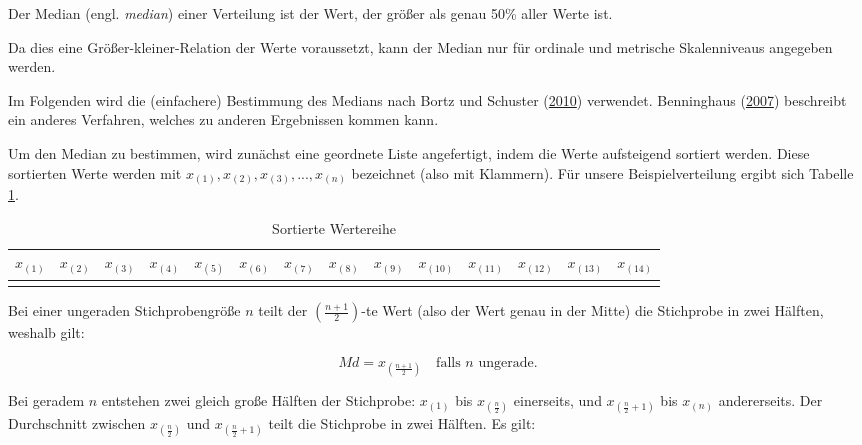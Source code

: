 \documentclass[
  11pt,
  ngerman,
  a4paper,
]{report}
\begin{document}
Der Median (engl. \emph{median}) einer Verteilung ist der Wert, der größer als genau 50\% aller Werte ist.

Da dies eine Größer-kleiner-Relation der Werte voraussetzt, kann der Median nur für ordinale und metrische Skalenniveaus angegeben werden.

Im Folgenden wird die (einfachere) Bestimmung des Medians nach Bortz und Schuster (\protect\hyperlink{ref-bortz}{2010}) verwendet. Benninghaus (\protect\hyperlink{ref-benninghaus}{2007}) beschreibt ein anderes Verfahren, welches zu anderen Ergebnissen kommen kann.

Um den Median zu bestimmen, wird zunächst eine geordnete Liste angefertigt, indem die Werte aufsteigend sortiert werden. Diese sortierten Werte werden mit \(x_{(1)}, x_{(2)}, x_{(3)}, ..., x_{(n)}\) bezeichnet (also mit Klammern). Für unsere Beispielverteilung ergibt sich Tabelle \ref{tab:sort}.

\begin{table}

\caption{\label{tab:sort}Sortierte Wertereihe}
\centering
\begin{tabular}[t]{rrrrrrrrrrrrrr}
\toprule
\textbf{$x_{(1)}$} & \textbf{$x_{(2)}$} & \textbf{$x_{(3)}$} & \textbf{$x_{(4)}$} & \textbf{$x_{(5)}$} & \textbf{$x_{(6)}$} & \textbf{$x_{(7)}$} & \textbf{$x_{(8)}$} & \textbf{$x_{(9)}$} & \textbf{$x_{(10)}$} & \textbf{$x_{(11)}$} & \textbf{$x_{(12)}$} & \textbf{$x_{(13)}$} & \textbf{$x_{(14)}$}\\
\midrule
\cellcolor{gray!6}{0} & \cellcolor{gray!6}{1} & \cellcolor{gray!6}{1} & \cellcolor{gray!6}{1} & \cellcolor{gray!6}{1} & \cellcolor{gray!6}{3} & \cellcolor{gray!6}{3} & \cellcolor{gray!6}{4} & \cellcolor{gray!6}{4} & \cellcolor{gray!6}{5} & \cellcolor{gray!6}{5} & \cellcolor{gray!6}{5} & \cellcolor{gray!6}{8} & \cellcolor{gray!6}{25}\\
\bottomrule
\end{tabular}
\end{table}

Bei einer ungeraden Stichprobengröße \(n\) teilt der \((\frac{n+1}{2})\)-te Wert (also der Wert genau in der Mitte) die Stichprobe in zwei Hälften, weshalb gilt:

\[
  \mathit{Md} = x_{(\frac{n+1}{2})} \quad \text{falls }n\text{ ungerade.}
  \label{eq:med1}
\]

Bei geradem \(n\) entstehen zwei gleich große Hälften der Stichprobe: \(x_{(1)}\) bis \(x_{(\frac{n}{2})}\) einerseits, und \(x_{(\frac{n}{2}+1)}\) bis \(x_{(n)}\) andererseits. Der Durchschnitt zwischen \(x_{(\frac{n}{2})}\) und \(x_{(\frac{n}{2}+1)}\) teilt die Stichprobe in zwei Hälften. Es gilt:
\end{document}
